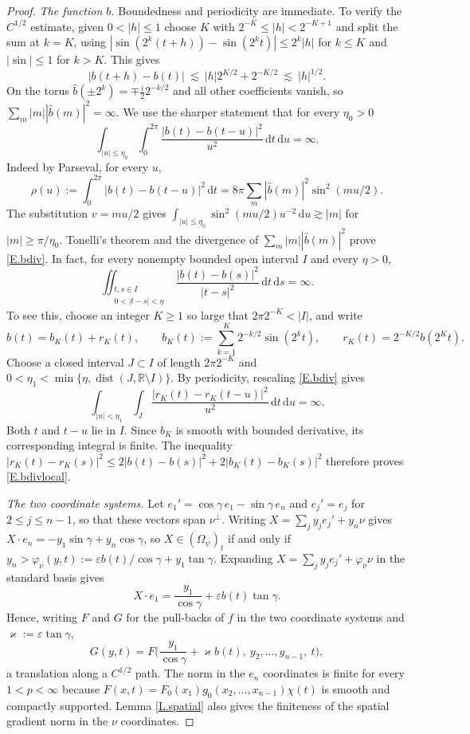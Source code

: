 \documentclass[12pt,leqno]{amsart}
\numberwithin{equation}{section}
\newcommand{\R}{\mathbb R}
\newcommand{\wh}{\widehat}
\newcommand{\om}{\Omega}
\renewcommand{\d}{\,\mathrm d}
\theoremstyle{plain}
\theoremstyle{remark}
\begin{document}
\begin{proof}
\emph{The function $b$.} Boundedness and periodicity are immediate. To verify
the $C^{1/2}$ estimate, given $0<|h|\le1$ choose $K$ with
$2^{-K}\le|h|<2^{-K+1}$ and split the sum at $k=K$, using
$|\sin(2^k(t+h))-\sin(2^kt)|\le2^k|h|$ for $k\le K$ and $|\sin|\le1$ for
$k>K$. This gives
$$|b(t+h)-b(t)|\ \lesssim\ |h|2^{K/2}+2^{-K/2}\ \lesssim\ |h|^{1/2} .$$
On the torus $\wh b(\pm2^k)=\mp\frac i22^{-k/2}$ and all other coefficients
vanish, so $\sum_m|m||\wh b(m)|^2=\infty$. We use the sharper statement
that for every $\eta_0>0$
\begin{equation}\label{E.bdiv}
  \int_{|u|\le\eta_0}\int_0^{2\pi}\frac{|b(t)-b(t-u)|^2}{u^2}\d t\d u=\infty .
\end{equation}
Indeed by Parseval, for every $u$,
\[
  \rho(u):=\int_0^{2\pi}|b(t)-b(t-u)|^2\d t
  =8\pi\sum_m|\wh b(m)|^2\sin^2(mu/2) .
\]
The substitution $v=mu/2$ gives
$\int_{|u|\le\eta_0}\sin^2(mu/2)u^{-2}\d u\gtrsim|m|$
for $|m|\ge\pi/\eta_0$. Tonelli's theorem and the divergence of
$\sum_m|m||\wh b(m)|^2$ prove \eqref{E.bdiv}.
In fact, for every nonempty bounded open interval $I$ and every $\eta>0$,
\begin{equation}\label{E.bdivlocal}
 \iint_{\substack{t,s\in I\\0<|t-s|<\eta}}
 \frac{|b(t)-b(s)|^2}{|t-s|^2}\d t\d s=\infty.
\end{equation}
To see this, choose an integer $K\ge1$ so large that $2\pi2^{-K}<|I|$,
and write
\[
 b(t)=b_K(t)+r_K(t),\qquad
 b_K(t):=\sum_{k=1}^K2^{-k/2}\sin(2^kt),\qquad
 r_K(t)=2^{-K/2}b(2^Kt).
\]
Choose a closed interval $J\subset I$ of length $2\pi2^{-K}$ and
$0<\eta_1<\min\{\eta,\operatorname{dist}(J,\R\setminus I)\}$.
By periodicity, rescaling \eqref{E.bdiv} gives
\[
 \int_{|u|<\eta_1}\int_J
 \frac{|r_K(t)-r_K(t-u)|^2}{u^2}\d t\d u=\infty.
\]
Both $t$ and $t-u$ lie in $I$. Since $b_K$ is smooth with bounded
derivative, its corresponding integral is finite. The inequality
$|r_K(t)-r_K(s)|^2\le2|b(t)-b(s)|^2+2|b_K(t)-b_K(s)|^2$
therefore proves \eqref{E.bdivlocal}.

\emph{The two coordinate systems.} Let
$e_1'=\cos\gamma\,e_1-\sin\gamma\,e_n$ and $e_j'=e_j$ for
$2\le j\le n-1$, so that these vectors span $\nu^\perp$. Writing
$X=\sum_jy_je_j'+y_n\nu$ gives $X\cdot e_n=-y_1\sin\gamma+y_n\cos\gamma$, so
$X\in(\om_\psi)_t$ if and only if
$y_n>\varphi_\nu(y,t):=\varepsilon b(t)/\cos\gamma+y_1\tan\gamma$. Expanding
$X=\sum_jy_je_j'+\varphi_\nu\nu$ in the standard basis gives
$$X\cdot e_1=\frac{y_1}{\cos\gamma}+\varepsilon b(t)\tan\gamma .$$
Hence, writing $F$ and $G$ for
the pull-backs of $f$ in the two coordinate systems and $\varkappa:=\varepsilon\tan\gamma$,
\begin{equation}\label{E.framecx}
  G(y,t)=F\Big(\frac{y_1}{\cos\gamma}+\varkappa b(t),\ y_2,\dots,y_{n-1},\ t\Big),
\end{equation}
a translation along a $C^{1/2}$ path. The norm in the $e_n$ coordinates is
finite for every $1<p<\infty$ because
$F(x,t)=F_0(x_1)g_0(x_2,\dots,x_{n-1})\chi(t)$ is smooth and compactly
supported. Lemma \ref{L.spatial} also gives the finiteness of the spatial
gradient norm in the $\nu$ coordinates.


\end{proof}
\end{document}
